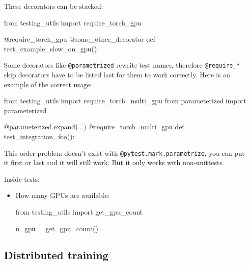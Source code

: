 \documentclass[
]{report}
\newenvironment{Shaded}{\begin{snugshade}}{\end{snugshade}}
\newcommand{\AttributeTok}[1]{\textcolor[rgb]{0.40,0.45,0.13}{#1}}
\newcommand{\ImportTok}[1]{\textcolor[rgb]{0.00,0.46,0.62}{#1}}
\newcommand{\KeywordTok}[1]{\textcolor[rgb]{0.00,0.23,0.31}{#1}}
\newcommand{\NormalTok}[1]{\textcolor[rgb]{0.00,0.23,0.31}{#1}}
\newcommand{\OperatorTok}[1]{\textcolor[rgb]{0.37,0.37,0.37}{#1}}
\begin{document}
These decorators can be stacked:

\begin{Shaded}
\begin{Highlighting}[]
\ImportTok{from}\NormalTok{ testing\_utils }\ImportTok{import}\NormalTok{ require\_torch\_gpu}

\AttributeTok{@require\_torch\_gpu}
\AttributeTok{@some\_other\_decorator}
\KeywordTok{def}\NormalTok{ test\_example\_slow\_on\_gpu():}
\end{Highlighting}
\end{Shaded}

Some decorators like \texttt{@parametrized} rewrite test names,
therefore \texttt{@require\_*} skip decorators have to be listed last
for them to work correctly. Here is an example of the correct usage:

\begin{Shaded}
\begin{Highlighting}[]
\ImportTok{from}\NormalTok{ testing\_utils }\ImportTok{import}\NormalTok{ require\_torch\_multi\_gpu}
\ImportTok{from}\NormalTok{ parameterized }\ImportTok{import}\NormalTok{ parameterized}

\AttributeTok{@parameterized.expand}\NormalTok{(...)}
\AttributeTok{@require\_torch\_multi\_gpu}
\KeywordTok{def}\NormalTok{ test\_integration\_foo():}
\end{Highlighting}
\end{Shaded}

This order problem doesn't exist with \texttt{@pytest.mark.parametrize},
you can put it first or last and it will still work. But it only works
with non-unittests.

Inside tests:

\begin{itemize}
\item
  How many GPUs are available:

\begin{Shaded}
\begin{Highlighting}[]
\ImportTok{from}\NormalTok{ testing\_utils }\ImportTok{import}\NormalTok{ get\_gpu\_count}

\NormalTok{n\_gpu }\OperatorTok{=}\NormalTok{ get\_gpu\_count()}
\end{Highlighting}
\end{Shaded}
\end{itemize}

\subsection{Distributed training}\label{distributed-training}
\end{document}
